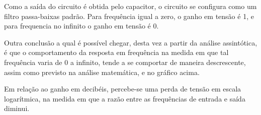 \documentclass[12pt]{article}
\begin{document}
Como a saída do circuito é obtida pelo capacitor, o circuito se configura como um filtro passa-baixas padrão. Para frequência igual a zero, o ganho em tensão é 1, e para frequencia no infinito o ganho em tensão é 0.

Outra conclusão a qual é possível chegar, desta vez a partir da análise assintótica, é que o comportamento da resposta em frequência na medida em que tal frequência varia de 0 a infinito, tende a se comportar de maneira descrescente, assim como previsto na análise matemática, e no gráfico acima.

Em relação ao ganho em decibéis, percebe-se uma perda de tensão em escala logarítmica, na medida em que a razão entre as frequências de entrada e saída diminui.



\end{document}
